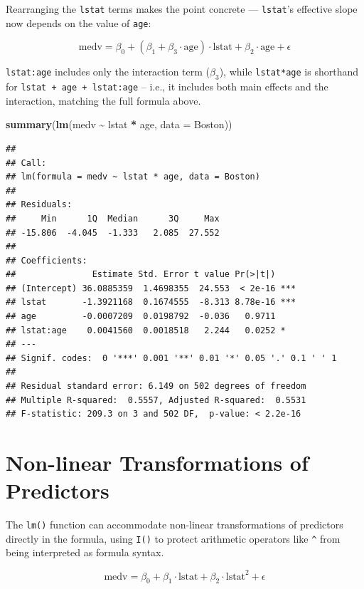 \documentclass[
  11pt,
]{article}
\newenvironment{Shaded}{\begin{snugshade}}{\end{snugshade}}
\newcommand{\AttributeTok}[1]{\textcolor[rgb]{0.13,0.29,0.53}{#1}}
\newcommand{\FunctionTok}[1]{\textcolor[rgb]{0.13,0.29,0.53}{\textbf{#1}}}
\newcommand{\NormalTok}[1]{#1}
\newcommand{\SpecialCharTok}[1]{\textcolor[rgb]{0.81,0.36,0.00}{\textbf{#1}}}
\begin{document}
Rearranging the \texttt{lstat} terms makes the point concrete ---
\texttt{lstat}'s effective slope now depends on the value of
\texttt{age}:

\[
\text{medv} = \beta_0 + (\beta_1 + \beta_3 \cdot \text{age}) \cdot \text{lstat} + \beta_2 \cdot \text{age} + \epsilon
\]

\texttt{lstat:age} includes only the interaction term (\(\beta_3\)),
while \texttt{lstat*age} is shorthand for
\texttt{lstat\ +\ age\ +\ lstat:age} -- i.e., it includes both main
effects and the interaction, matching the full formula above.

\begin{Shaded}
\begin{Highlighting}[]
\FunctionTok{summary}\NormalTok{(}\FunctionTok{lm}\NormalTok{(medv }\SpecialCharTok{\textasciitilde{}}\NormalTok{ lstat }\SpecialCharTok{*}\NormalTok{ age, }\AttributeTok{data =}\NormalTok{ Boston))}
\end{Highlighting}
\end{Shaded}

\begin{verbatim}
## 
## Call:
## lm(formula = medv ~ lstat * age, data = Boston)
## 
## Residuals:
##     Min      1Q  Median      3Q     Max 
## -15.806  -4.045  -1.333   2.085  27.552 
## 
## Coefficients:
##               Estimate Std. Error t value Pr(>|t|)    
## (Intercept) 36.0885359  1.4698355  24.553  < 2e-16 ***
## lstat       -1.3921168  0.1674555  -8.313 8.78e-16 ***
## age         -0.0007209  0.0198792  -0.036   0.9711    
## lstat:age    0.0041560  0.0018518   2.244   0.0252 *  
## ---
## Signif. codes:  0 '***' 0.001 '**' 0.01 '*' 0.05 '.' 0.1 ' ' 1
## 
## Residual standard error: 6.149 on 502 degrees of freedom
## Multiple R-squared:  0.5557, Adjusted R-squared:  0.5531 
## F-statistic: 209.3 on 3 and 502 DF,  p-value: < 2.2e-16
\end{verbatim}

\section{Non-linear Transformations of
Predictors}\label{non-linear-transformations-of-predictors}

The \texttt{lm()} function can accommodate non-linear transformations of
predictors directly in the formula, using \texttt{I()} to protect
arithmetic operators like \texttt{\^{}} from being interpreted as
formula syntax.

\[
\text{medv} = \beta_0 + \beta_1 \cdot \text{lstat} + \beta_2 \cdot \text{lstat}^2 + \epsilon
\]
\end{document}
